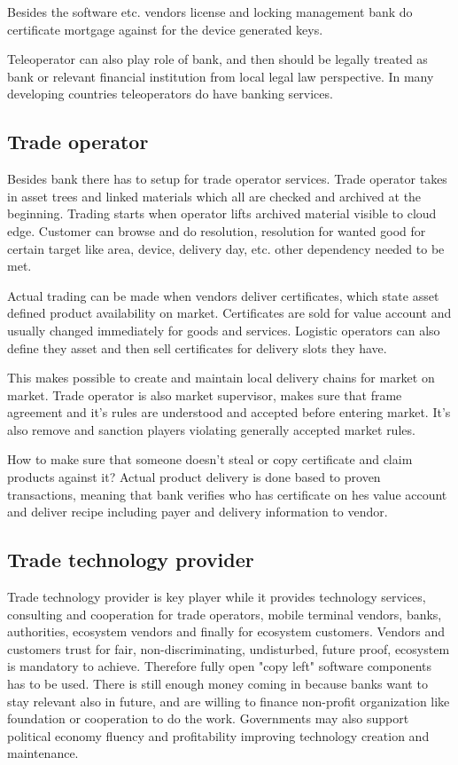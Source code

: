 Besides the software etc. vendors license and locking management bank do certificate mortgage against for the device generated keys.

Teleoperator can also play role of bank, and then should be legally treated as bank or relevant financial institution from local legal law perspective. In many developing countries teleoperators do have banking services.

\subsection{Trade operator}
\label{trade_operator}
Besides bank there has to setup for trade operator services. Trade operator takes in asset trees and linked materials which all are checked and archived at the beginning. Trading starts when operator lifts archived material visible to cloud edge. Customer can browse and do resolution, resolution for wanted good for certain target like area, device, delivery day, etc. other dependency needed to be met. 

Actual trading can be made when vendors deliver certificates, which state asset defined product availability on market. Certificates are sold for value account and usually changed immediately for goods and services. Logistic operators can also define they asset and then sell certificates for delivery slots they have.

This makes possible to create and maintain local delivery chains for market on market. Trade operator is also market supervisor, makes sure that frame agreement and it's rules are understood and accepted before entering market. It's also remove and sanction players violating generally accepted market rules.

How to make sure that someone doesn't steal or copy certificate and claim products against it? Actual product delivery is done based to proven transactions, meaning that bank verifies who has certificate on hes value account and deliver recipe including payer and delivery information to vendor.

\subsection{Trade technology provider}
\label{tehnology_provider}

Trade technology provider is key player while it provides technology services, consulting and cooperation for trade operators, mobile terminal vendors, banks, authorities, ecosystem vendors and finally for ecosystem customers. Vendors and customers trust for fair, non-discriminating, undisturbed, future proof, ecosystem is mandatory to achieve. Therefore fully open "copy left" software components has to be used. There is still enough money coming in because banks want to stay relevant also in future, and are willing to finance non-profit organization like foundation or cooperation to do the work. Governments may also support political economy fluency and profitability improving technology creation and maintenance.

